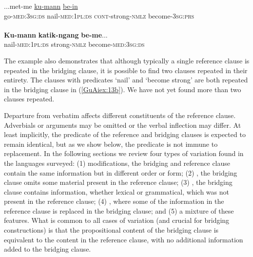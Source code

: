 \documentclass[output=paper]{LSP/langsci}
\begin{document}
\begin{exe}
\ex \label{GuAiex:13ab}
\begin{xlist}
\ex \label{GuAiex:13a}
\gll ...met-me     \underline{ku-mann}     \underline{}  \underline{be-in}\\
go-\textsc{med:3sg:ds}   nail-\textsc{med:1pl:ds}   \textsc{cont}-strong-\textsc{nmlz}   become-\textsc{3sg:prs}\\
\glt {} \\
\ex \label{GuAiex:13b}
\gll \textbf{Ku-mann}     \textbf{katik-ngang}    \textbf{be-me}... \\
nail-\textsc{med:1pl:ds}   strong-\textsc{nmlz}     become-\textsc{med:3sg:ds}\\
\glt {} 
\end{xlist}
\end{exe}


The  example also demonstrates that although typically a single reference clause is repeated in the bridging clause, it is possible to find two clauses repeated in their entirety. The clauses with predicates `nail' and `become strong' are both repeated in the bridging clause in (\ref{GuAiex:13b}). We have not yet found more than two clauses repeated.

Departure from verbatim  affects different constituents of the reference clause. Adverbials or arguments may be omitted or the verbal inflection may differ. At least implicitly, the predicate of the reference and bridging clauses is expected to remain identical, but as we show below, the predicate is not immune to replacement. In the following sections we review four types of variation found in the languages surveyed: (1) modifications, the bridging and reference clause contain the same information but in different order or form; (2) , the bridging clause omits some material present in the reference clause; (3) , the bridging clause contains information, whether lexical or grammatical, which was not present in the reference clause; (4) , where some of the information in the reference clause is replaced in the bridging clause; and (5) a mixture of these features. What is common to all cases of variation (and crucial for bridging constructions) is that the propositional content of the bridging clause is equivalent to the content in the reference clause, with no additional information added to the bridging clause.
\end{document}
